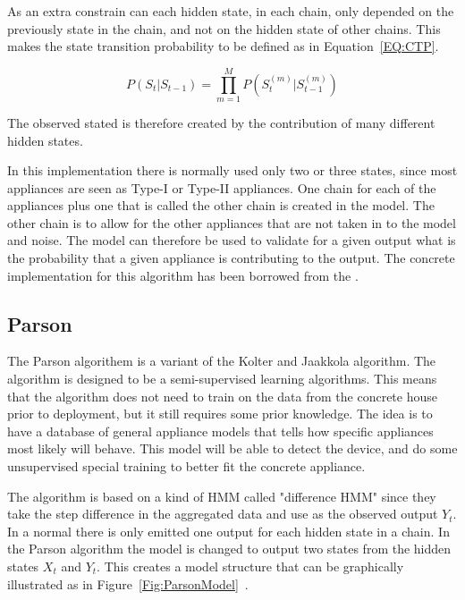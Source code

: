 As an extra constrain can each hidden state, in each chain, only depended on the previously state in the chain, and not on the hidden state of other chains. This makes the state transition probability to be defined as in Equation~\ref{EQ:CTP}. 

\begin{equation}
	P(S_t|S_{t-1}) = \prod_{m = 1}^M P\left( S_t^{(m)}| S_{t-1}^{(m)} \right)
	\label{EQ:CTP}
\end{equation}

The observed stated is therefore created by the contribution of many different hidden states. 

In this implementation there is normally used only two or three states, since most appliances are seen as Type-I or Type-II appliances. One chain for each of the appliances plus one that is called the other chain is created in the model. The other chain is to allow for the other appliances that are not taken in to the model and noise. The model can therefore be used to validate for a given output what is the probability that a given appliance is contributing to the output. The concrete implementation for this algorithm has been borrowed from the  \citep{RefWorks:21}. 

\subsection{Parson}
The Parson algorithem is a variant of the Kolter and Jaakkola algorithm\citep{RefWorks:22}. The algorithm is designed to be a semi-supervised learning algorithms. This means that the algorithm does not need to train on the data from the concrete house prior to deployment, but it still requires some prior knowledge. The idea is to have a database of general appliance models that tells how specific appliances most likely will behave. This model will be able to detect the device, and do some unsupervised special training to better fit the concrete appliance. 

The algorithm is based on a kind of HMM called "difference HMM" since they take the step difference in the aggregated data and use as the observed output $Y_t$. In a normal  there is only emitted one output for each hidden state in a chain. In the Parson algorithm the model is changed to output two states from the hidden states $X_t$ and $Y_t$. This creates a model structure that can be graphically illustrated as in Figure~\ref{Fig:ParsonModel}~\citep{RefWorks:28}. 

